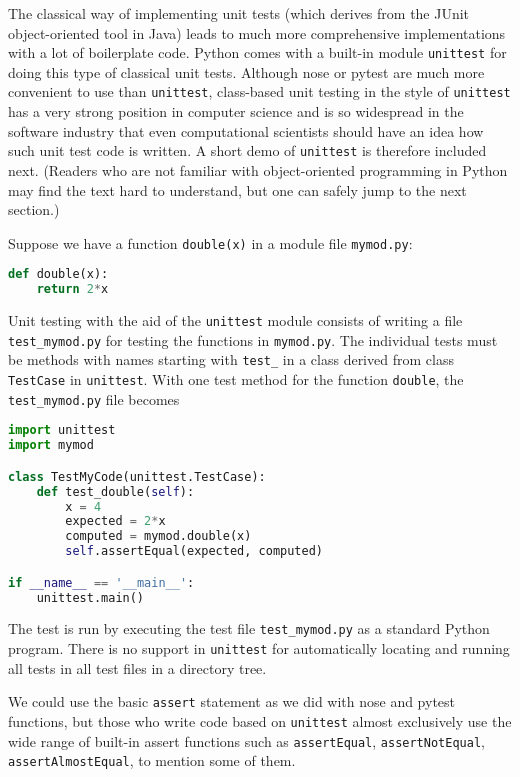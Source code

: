 \documentclass[graybox,sectrefs,envcountresetchap,open=right,final]{svmonodo}
\begin{document}
The classical way of implementing unit tests (which derives from the
JUnit object-oriented tool in Java) leads to much more comprehensive
implementations with a lot of boilerplate code.  Python comes with a
built-in module \texttt{unittest} for doing this type of classical unit
tests. Although nose or pytest are much more convenient to use than
\texttt{unittest}, class-based unit testing in the style of \texttt{unittest} has a
very strong position in computer science and is so widespread in
the software industry that
even computational scientists should have an idea how such unit test
code is written. A short demo of \texttt{unittest} is therefore included
next. (Readers who are not familiar with object-oriented programming
in Python may find the text hard to understand, but one can safely
jump to the next section.)

 

Suppose we have a function \texttt{double(x)} in a module file \texttt{mymod.py}:

\begin{lstlisting}[language=Python,style=blue1_bluegreen]
def double(x):
    return 2*x
\end{lstlisting}
Unit testing with the aid of the \texttt{unittest} module
consists of writing a file \Verb!test_mymod.py! for testing the functions
in \texttt{mymod.py}. The individual tests must be methods with names
starting with \Verb!test_! in a class derived from class \texttt{TestCase} in
\texttt{unittest}. With one test method for the function \texttt{double}, the
\Verb!test_mymod.py! file becomes

\begin{lstlisting}[language=Python,style=blue1_bluegreen]
import unittest
import mymod

class TestMyCode(unittest.TestCase):
    def test_double(self):
        x = 4
        expected = 2*x
        computed = mymod.double(x)
        self.assertEqual(expected, computed)

if __name__ == '__main__':
    unittest.main()
\end{lstlisting}
The test is run by executing the test file \Verb!test_mymod.py! as a standard
Python program. There is no support in \texttt{unittest} for automatically
locating and running all tests in all test files in a directory tree.

We could use the basic \texttt{assert} statement as we did with nose and pytest
functions, but those who write code based on \texttt{unittest} almost
exclusively use the wide range of built-in assert functions such
as \texttt{assertEqual}, \texttt{assertNotEqual}, \texttt{assertAlmostEqual}, to mention
some of them.
\end{document}
